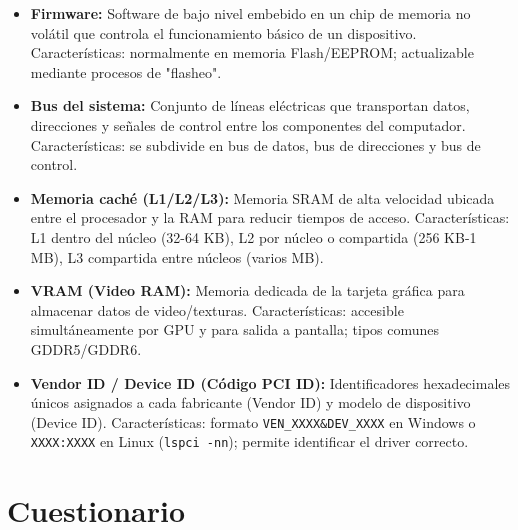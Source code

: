 \documentclass[10pt]{article}
\begin{document}
\begin{itemize}
    \item \textbf{Firmware:} Software de bajo nivel embebido en un chip de memoria no volátil que controla el funcionamiento básico de un dispositivo. Características: normalmente en memoria Flash/EEPROM; actualizable mediante procesos de "flasheo".

    \item \textbf{Bus del sistema:} Conjunto de líneas eléctricas que transportan datos, direcciones y señales de control entre los componentes del computador. Características: se subdivide en bus de datos, bus de direcciones y bus de control.

    \item \textbf{Memoria caché (L1/L2/L3):} Memoria SRAM de alta velocidad ubicada entre el procesador y la RAM para reducir tiempos de acceso. Características: L1 dentro del núcleo (32-64 KB), L2 por núcleo o compartida (256 KB-1 MB), L3 compartida entre núcleos (varios MB).

    \item \textbf{VRAM (Video RAM):} Memoria dedicada de la tarjeta gráfica para almacenar datos de video/texturas. Características: accesible simultáneamente por GPU y para salida a pantalla; tipos comunes GDDR5/GDDR6.

    \item \textbf{Vendor ID / Device ID (Código PCI ID):} Identificadores hexadecimales únicos asignados a cada fabricante (Vendor ID) y modelo de dispositivo (Device ID). Características: formato \texttt{VEN\_XXXX\&DEV\_XXXX} en Windows o \texttt{XXXX:XXXX} en Linux (\texttt{lspci -nn}); permite identificar el driver correcto.
\end{itemize}

\section{Cuestionario}
\end{document}
